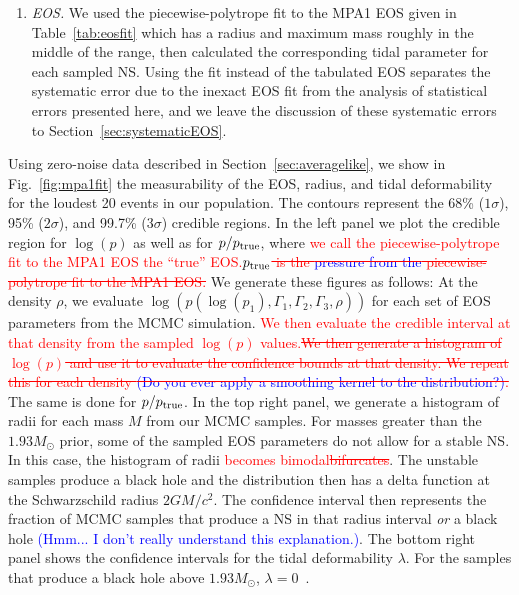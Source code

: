 \documentclass[twocolumn,prd,amssymb,aps,nofootinbib,showpacs,epsf]{revtex4}
\newcommand\ben[2]{\textcolor{red}{{#1}\sout{#2}}}
\newcommand\les[2]{\textcolor{blue}{{#1}\sout{#2}}}
\begin{document}
\begin{enumerate}
\item \textit{EOS.} We used the piecewise-polytrope fit to the MPA1 EOS given in Table~\ref{tab:eosfit} which has a radius and maximum mass roughly in the middle of the range, then calculated the corresponding tidal parameter for each sampled NS. Using the fit instead of the tabulated EOS separates the systematic error due to the inexact EOS fit from the analysis of statistical errors presented here, and we leave the discussion of these systematic errors to Section~\ref{sec:systematicEOS}.


\end{enumerate}

Using zero-noise data described in Section~\ref{sec:averagelike}, we show in Fig.~\ref{fig:mpa1fit} the measurability of the EOS, radius, and tidal deformability for the loudest 20 events in our population. The contours represent the 68\% ($1\sigma$), 95\% ($2\sigma$), and 99.7\% ($3\sigma$) credible regions. In the left panel we plot the credible region for $\log(p)$ as well as for $p/p_{\rm true}$, where \ben{we call the piecewise-polytrope fit to the MPA1 EOS the ``true'' EOS.}{$p_{\rm true}$ is the \les{pressure from the}{} piecewise-polytrope fit to the MPA1 EOS.} We generate these figures as follows: At the density $\rho$, we evaluate $\log(p(\log(p_1), \Gamma_1, \Gamma_2, \Gamma_3, \rho))$ for each set of EOS parameters from the MCMC simulation. \ben{We then evaluate the credible interval at that density from the sampled $\log(p)$ values.}{We then generate a histogram of $\log(p)$ and use it to evaluate the confidence bounds at that density. We repeat this for each density \les{(Do you ever apply a smoothing kernel to the distribution?)}{}.} The same is done for $p/p_{\rm true}$. In the top right panel, we generate a histogram of radii for each mass $M$ from our MCMC samples. For masses greater than the $1.93M_\odot$ prior, some of the sampled EOS parameters do not allow for a stable NS. In this case, the histogram of radii \ben{becomes bimodal}{bifurcates}. The unstable samples produce a black hole and the distribution then has a delta function at the Schwarzschild radius $2GM/c^2$. The confidence interval then represents the fraction of MCMC samples that produce a NS in that radius interval \textit{or} a black hole \les{(Hmm... I don't really understand this explanation.)}{}. The bottom right panel shows the confidence intervals for the tidal deformability $\lambda$. For the samples that produce a black hole above $1.93M_\odot$, $\lambda=0$~\cite{BinningtonPoisson2009}.
\end{document}
